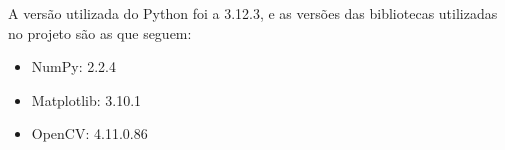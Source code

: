 A versão utilizada do Python foi a 3.12.3, e as versões das bibliotecas utilizadas no projeto são as que seguem:
\begin{itemize}
    \item NumPy: 2.2.4
    \item Matplotlib: 3.10.1
    \item OpenCV: 4.11.0.86
\end{itemize}